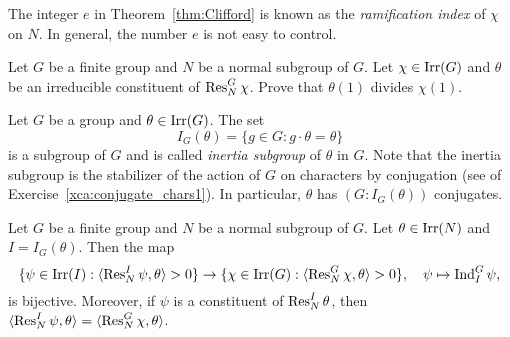 The integer $e$ in Theorem~\ref{thm:Clifford} is known as the \emph{ramification index} of $\chi$ on $N$. In general, the number $e$ is not easy to control. 

\begin{exercise}
\label{xca:Clifford_divisibility}
    Let $G$ be a finite group and $N$ be a normal subgroup of $G$. Let $\chi\in\operatorname{Irr}(G)$ and $\theta$ 
    be an irreducible constituent of $\operatorname{Res}_N^G\chi$. 
    Prove that $\theta(1)$ divides $\chi(1)$. 
\end{exercise}

Let $G$ be a group and $\theta\in\operatorname{Irr}(G)$. The set 
\[
I_G(\theta)=\{g\in G:g\cdot\theta=\theta\}
\]
is a subgroup of $G$ and is called \emph{inertia subgroup} of $\theta$ in $G$. Note that the inertia
subgroup is the stabilizer of the action of $G$ 
on characters by conjugation (see 
of Exercise~\ref{xca:conjugate_chars1}). In particular, 
$\theta$ has 
$(G:I_G(\theta))$ conjugates. 

\begin{theorem}
    Let $G$ be a finite group and $N$ be a normal subgroup of $G$. Let $\theta\in\operatorname{Irr}(N)$ and $I=I_G(\theta)$.  Then 
    the map 
    \[
    \{\psi\in\operatorname{Irr}(I):\langle\operatorname{Res}_N^I\psi,\theta\rangle>0\}\to 
    \{\chi\in\operatorname{Irr}(G):\langle\operatorname{Res}_N^G\chi,\theta\rangle>0\},\quad 
    \psi\mapsto\operatorname{Ind}_I^G\psi,
    \]
    is bijective. Moreover, if $\psi$ is a constituent of $\operatorname{Res}_N^I\theta$, then 
    $\langle\operatorname{Res}_N^I\psi,\theta\rangle=\langle\operatorname{Res}_N^G\chi,\theta\rangle$. 
\end{theorem}


